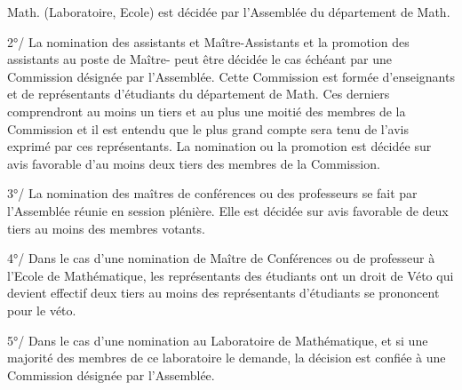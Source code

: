 
Math. (Laboratoire, Ecole) est décidée par l'Assemblée du département de Math.

2°/ La nomination des assistants et Maître-Assistants et la promotion des assistants au poste de Maître- peut être décidée le cas échéant par une Commission désignée par l'Assemblée. Cette Commission est formée d'enseignants et de représentants d'étudiants du département de Math. Ces derniers comprendront au moins un tiers et au plus une moitié des membres de la Commission et il est entendu que le plus grand compte sera tenu de l'avis exprimé par ces représentants. La nomination ou la promotion est décidée sur avis favorable d'au moins deux tiers des membres de la Commission.

3°/ La nomination des maîtres de conférences ou des professeurs se fait par l'Assemblée réunie en session plénière. Elle est décidée sur avis favorable de deux tiers au moins des membres votants.

4°/ Dans le cas d'une nomination de Maître de Conférences ou de professeur à l'Ecole de Mathématique, les représentants des étudiants ont un droit de Véto qui devient effectif  deux tiers au moins des représentants d'étudiants se prononcent pour le véto.

5°/ Dans le cas d'une nomination au Laboratoire de Mathématique, et si une majorité des membres de ce laboratoire le demande, la décision est confiée à une Commission désignée par l'Assemblée.

